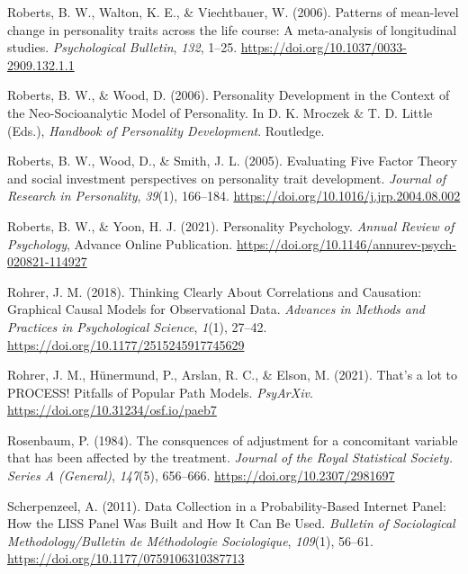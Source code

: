 \documentclass[
  english,
  man, noextraspace,floatsintext]{apa7}
\begin{document}
\leavevmode\hypertarget{ref-robertsPatternsMeanlevelChange2006a}{}%
Roberts, B. W., Walton, K. E., \& Viechtbauer, W. (2006). Patterns of mean-level change in personality traits across the life course: A meta-analysis of longitudinal studies. \emph{Psychological Bulletin}, \emph{132}, 1--25. \url{https://doi.org/10.1037/0033-2909.132.1.1}

\leavevmode\hypertarget{ref-robertsPersonalityDevelopmentContext2006}{}%
Roberts, B. W., \& Wood, D. (2006). Personality Development in the Context of the Neo-Socioanalytic Model of Personality. In D. K. Mroczek \& T. D. Little (Eds.), \emph{Handbook of Personality Development}. Routledge.

\leavevmode\hypertarget{ref-robertsEvaluatingFiveFactor2005}{}%
Roberts, B. W., Wood, D., \& Smith, J. L. (2005). Evaluating Five Factor Theory and social investment perspectives on personality trait development. \emph{Journal of Research in Personality}, \emph{39}(1), 166--184. \url{https://doi.org/10.1016/j.jrp.2004.08.002}

\leavevmode\hypertarget{ref-robertsPersonalityPsychology2021}{}%
Roberts, B. W., \& Yoon, H. J. (2021). Personality Psychology. \emph{Annual Review of Psychology}, Advance Online Publication. \url{https://doi.org/10.1146/annurev-psych-020821-114927}

\leavevmode\hypertarget{ref-rohrerThinkingClearlyCorrelations2018}{}%
Rohrer, J. M. (2018). Thinking Clearly About Correlations and Causation: Graphical Causal Models for Observational Data. \emph{Advances in Methods and Practices in Psychological Science}, \emph{1}(1), 27--42. \url{https://doi.org/10.1177/2515245917745629}

\leavevmode\hypertarget{ref-rohrerThatLotPROCESS2021}{}%
Rohrer, J. M., Hünermund, P., Arslan, R. C., \& Elson, M. (2021). That's a lot to PROCESS! Pitfalls of Popular Path Models. \emph{PsyArXiv}. \url{https://doi.org/10.31234/osf.io/paeb7}

\leavevmode\hypertarget{ref-rosenbaumConsquencesAdjustmentConcomitant1984}{}%
Rosenbaum, P. (1984). The consquences of adjustment for a concomitant variable that has been affected by the treatment. \emph{Journal of the Royal Statistical Society. Series A (General)}, \emph{147}(5), 656--666. \url{https://doi.org/10.2307/2981697}

\leavevmode\hypertarget{ref-scherpenzeelDataCollectionProbabilityBased2011}{}%
Scherpenzeel, A. (2011). Data Collection in a Probability-Based Internet Panel: How the LISS Panel Was Built and How It Can Be Used. \emph{Bulletin of Sociological Methodology/Bulletin de Méthodologie Sociologique}, \emph{109}(1), 56--61. \url{https://doi.org/10.1177/0759106310387713}
\end{document}
